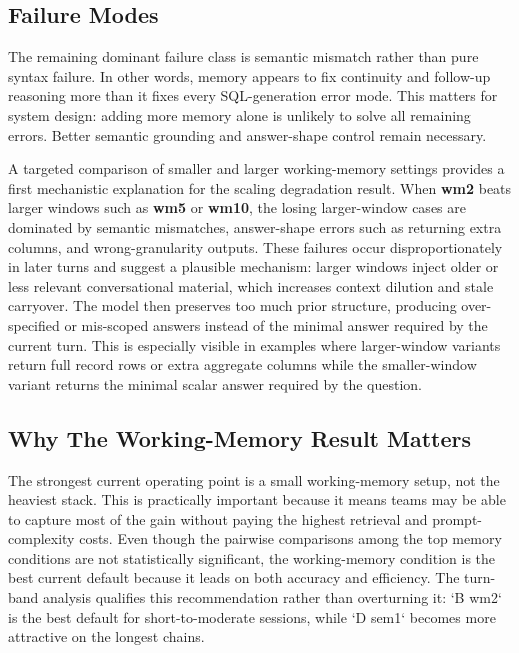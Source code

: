 \documentclass[11pt]{article}
\begin{document}
\subsection{Failure Modes}
The remaining dominant failure class is semantic mismatch rather than pure syntax failure. In other words, memory appears to fix continuity and follow-up reasoning more than it fixes every SQL-generation error mode. This matters for system design: adding more memory alone is unlikely to solve all remaining errors. Better semantic grounding and answer-shape control remain necessary.

A targeted comparison of smaller and larger working-memory settings provides a first mechanistic explanation for the scaling degradation result. When \textbf{wm2} beats larger windows such as \textbf{wm5} or \textbf{wm10}, the losing larger-window cases are dominated by semantic mismatches, answer-shape errors such as returning extra columns, and wrong-granularity outputs. These failures occur disproportionately in later turns and suggest a plausible mechanism: larger windows inject older or less relevant conversational material, which increases context dilution and stale carryover. The model then preserves too much prior structure, producing over-specified or mis-scoped answers instead of the minimal answer required by the current turn. This is especially visible in examples where larger-window variants return full record rows or extra aggregate columns while the smaller-window variant returns the minimal scalar answer required by the question.

\subsection{Why The Working-Memory Result Matters}
The strongest current operating point is a small working-memory setup, not the heaviest stack. This is practically important because it means teams may be able to capture most of the gain without paying the highest retrieval and prompt-complexity costs. Even though the pairwise comparisons among the top memory conditions are not statistically significant, the working-memory condition is the best current default because it leads on both accuracy and efficiency. The turn-band analysis qualifies this recommendation rather than overturning it: `B wm2` is the best default for short-to-moderate sessions, while `D sem1` becomes more attractive on the longest chains.
\end{document}
